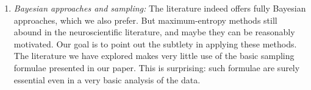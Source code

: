 \documentclass{article}
\begin{document}
\begin{enumerate}[wide]
\item \emph{Bayesian approaches and sampling:} The literature indeed offers
  fully Bayesian approaches, which we also prefer. But maximum-entropy
  methods still abound in the neuroscientific literature, and maybe they
  can be reasonably motivated. Our goal is to point out the subtlety in
  applying these methods. The literature we have explored makes very little
  use of the basic sampling formulae presented in our paper. This is
  surprising: such formulae are surely essential even in a very basic
  analysis of the data.
\end{enumerate}

\bigskip
\end{document}
